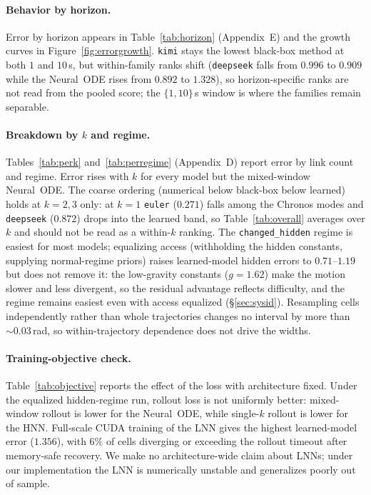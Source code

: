 \documentclass{article}
\begin{document}
\paragraph{Behavior by horizon.}
Error by horizon appears in Table~\ref{tab:horizon} (Appendix~E) and the growth curves in
Figure~\ref{fig:errorgrowth}. \texttt{kimi} stays the lowest black-box method at both $1$ and
$10$\,s, but within-family ranks shift (\texttt{deepseek} falls from $0.996$ to $0.909$ while
the Neural~ODE rises from $0.892$ to $1.328$), so horizon-specific ranks are not read from the
pooled score; the $\{1,10\}$\,s window is where the families remain separable.


\paragraph{Breakdown by $k$ and regime.}
\label{sec:breakdown}
Tables~\ref{tab:perk} and~\ref{tab:perregime} (Appendix~D) report error by link count and regime.
Error rises with $k$ for every model but the mixed-window Neural~ODE. The coarse ordering
(numerical below black-box below learned) holds at $k{=}2,3$ only: at $k{=}1$ \texttt{euler}
($0.271$) falls among the Chronos modes and \texttt{deepseek} ($0.872$) drops into the learned
band, so Table~\ref{tab:overall} averages over $k$ and should not be read as a within-$k$
ranking. The
\texttt{changed\_hidden} regime is easiest for most models; equalizing access (withholding the
hidden constants, supplying normal-regime priors) raises learned-model hidden errors to
$0.71$--$1.19$ but does not remove it: the low-gravity constants ($g{=}1.62$) make the motion
slower and less divergent, so the residual advantage reflects difficulty, and the regime remains
easiest even with access equalized (\S\ref{sec:sysid}).
Resampling cells independently rather than whole trajectories changes no interval by more than
${\sim}0.03$\,rad, so within-trajectory dependence does not drive the widths.

\paragraph{Training-objective check.}
\label{sec:objective}
Table~\ref{tab:objective} reports the effect of the loss with architecture fixed. Under the
equalized hidden-regime run, rollout loss is not uniformly better: mixed-window rollout
is lower for the Neural~ODE, while single-$k$ rollout is lower for the HNN. Full-scale CUDA
training of the LNN gives the highest learned-model error ($1.356$), with $6\%$ of cells
diverging or exceeding the rollout timeout after memory-safe recovery. We make no
architecture-wide claim about LNNs; under our implementation the LNN is
numerically unstable and generalizes poorly out of sample.
\end{document}
